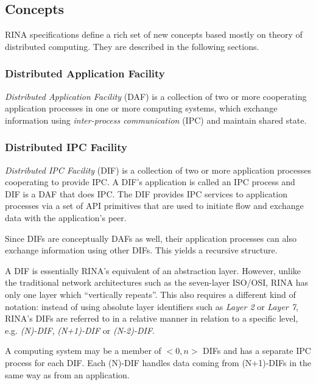         \subsection{Concepts}

            RINA specifications define a rich set of new concepts based mostly on theory of distributed computing. They are described in the following sections.

            \subsubsection{Distributed Application Facility}

                \emph{Distributed Application Facility} (DAF) is a collection of two or more cooperating application processes in one or more computing systems, which exchange information using \emph{inter-process communication} (IPC) and maintain shared state.

            \subsubsection{Distributed IPC Facility}

                \emph{Distributed IPC Facility} (DIF) is a collection of two or more application processes cooperating to provide IPC. A DIF's application is called an IPC process and DIF is a DAF that does IPC. The DIF provides IPC services to application processes via a set of API primitives that are used to initiate flow and exchange data with the application's peer.

                Since DIFs are conceptually DAFs as well, their application processes can also exchange information using other DIFs. This yields a recursive structure.

                A DIF is essentially RINA's equivalent of an abstraction layer. However, unlike the traditional network architectures such as the seven-layer ISO/OSI, RINA has only one layer which ``vertically repeats''. This also requires a different kind of notation: instead of using absolute layer identifiers such as \emph{Layer 2} or \emph{Layer 7}, RINA's DIFs are referred to in a relative manner in relation to a specific level, e.g. \emph{(N)-DIF}, \emph{(N+1)-DIF} or \emph{(N-2)-DIF}.

                A computing system may be a member of $<0,n>$ DIFs and has a separate IPC process for each DIF. Each (N)-DIF handles data coming from (N+1)-DIFs in the same way as from an application.

